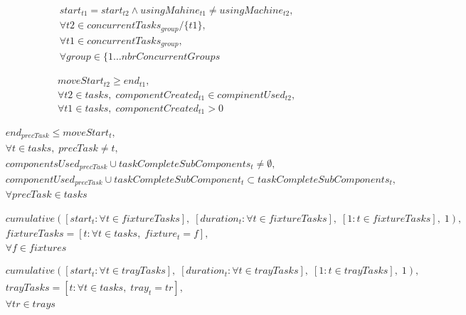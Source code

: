 \documentclass[10pt,a4paper]{report}
\begin{document}
\begin{align*}
&start_{t1} = start_{t2} \land usingMahine_{t1} \neq usingMachine_{t2},\\
&\forall t2 \in concurrentTasks_{group} / \{t1\},\\
&\forall t1 \in concurrentTasks_{group},\\
&\forall group \in \{1 \ldots nbrConcurrentGroups
\end{align*}

\begin{align*}
&moveStart_{t2} \geq end_{t1},\\
&\forall t2 \in tasks, \; componentCreated_{t1} \in compinentUsed_{t2},\\
&\forall t1 \in tasks, \; componentCreated_{t1} > 0
\end{align*}

\begin{align*}
&end_{precTask} \leq moveStart_t,\\
&\forall t \in tasks, \; precTask \neq t,\\
&componentsUsed_{precTask} \cup taskCompleteSubComponents_t \neq \emptyset,\\
&componentUsed_{precTask} \cup taskCompleteSubComponent_t \subset taskCompleteSubComponents_t,\\
&\forall precTask \in tasks
\end{align*}

\begin{align*}
&cumulative([start_{t} : \forall t \in fixtureTasks], \; [duration_t : \forall t \in fixtureTasks], \; [1 : t \in fixtureTasks], \; 1),\\
&fixtureTasks = [t : \forall t \in tasks, \; fixture_t = f],\\
&\forall f \in fixtures
\end{align*}

\begin{align*}
&cumulative([start_{t} : \forall t \in trayTasks], \; [duration_t : \forall t \in trayTasks], \; [1 : t \in trayTasks], \; 1),\\
&trayTasks = [t : \forall t \in tasks, \; tray_t = tr],\\
&\forall tr \in trays
\end{align*}
\end{document}
